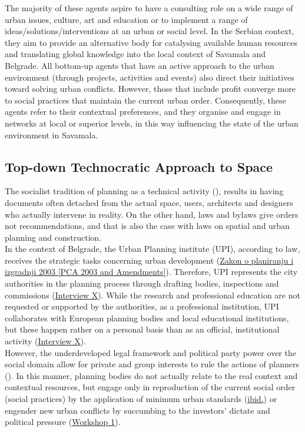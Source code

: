 \documentclass[11pt]{report}
\begin{document}
{{{{The majority of these agents aspire to have a consulting role on a wide range of urban issues, culture, art and education or to implement a range of ideas/solutions/interventions at an urban or social level.
In the Serbian context, they aim to provide an alternative body for catalysing available human resources and translating global knowledge into the local context of Savamala and Belgrade.
All bottom-up agents that have an active approach to the urban environment (through projects, activities and events) also direct their initiatives toward solving urban conflicts. However, those that include profit converge more to social practices that maintain the current urban order.
Consequently, these agents refer to their contextual preferences, and they organise and engage in networks at local or superior levels, in this way influencing the state of the urban environment in Savamala.
    
\subsection{Top-down Technocratic Approach to Space}

The socialist tradition of planning as a technical activity (\href{ref}{\citealt{vujosevic_planning_2006}}), results in having documents often detached from the actual space, users, architects and designers who actually intervene in reality.
On the other hand, laws and bylaws give orders not recommendations, and 
that is also the case with laws on spatial and urban planning and construction.
\\

In the context of Belgrade, the Urban Planning institute (UPI), according to law, receives the strategic tasks concerning urban development (\href{ref}{Zakon o planiranju i izgradnji 2003 [PCA 2003 and Amendments]}).
Therefore, UPI represents the city authorities in the planning process through drafting bodies, inspections and commissions (\href{InterviewX}{Interview X}).
While the research and professional education are not requested or supported by the authorities, as a professional institution, UPI collaborates with European planning bodies and local educational institutions, but these happen rather on a personal basis than as an official, institutional activity
(\href{InterviewX}{Interview X}).
\\

However, the underdeveloped legal framework and political party power over the social domain allow for private and group interests to rule the actions of planners (\href{ref}{\citealt{vujovic_belgrades_2007}}).
In this manner, planning bodies do not actually relate to the real context and contextual resources, but engage only in reproduction of the current social order (social practices) by the application of minimum urban standards (\href{Vujovic}{ibid.}) or engender new urban conflicts by succumbing to the investors' dictate and political pressure
(\href{Expert Workshop}{Workshop 1}).
\\

}}}}
\end{document}
